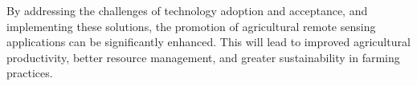 By addressing the challenges of technology adoption and acceptance, and implementing these solutions, the promotion of agricultural remote sensing applications can be significantly enhanced. This will lead to improved agricultural productivity, better resource management, and greater sustainability in farming practices.